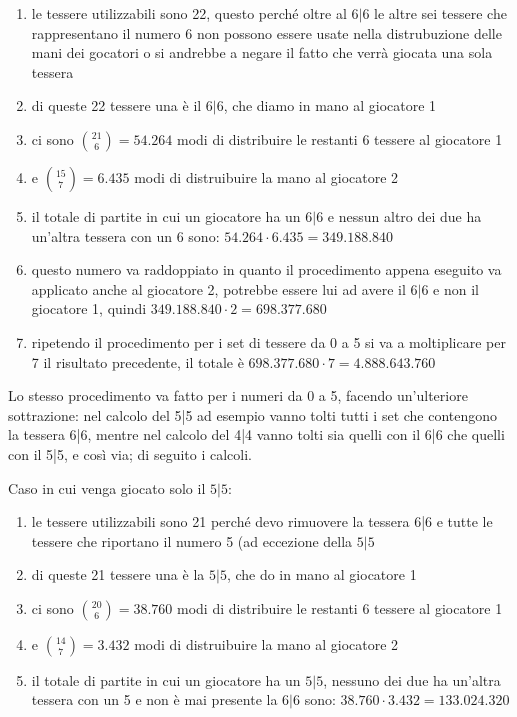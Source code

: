 \documentclass[a4paper,12pt]{report}
\begin{document}
\begin{enumerate}
    \item le tessere utilizzabili sono 22, questo perché oltre al \(6|6\) le altre sei tessere che rappresentano il numero 6 non possono essere usate nella distrubuzione delle mani dei gocatori o si andrebbe a negare il fatto che verrà giocata una sola tessera 
    \item di queste 22 tessere una è il \(6|6\), che diamo in mano al giocatore 1
    \item ci sono \(\binom{21}{6} = 54.264\) modi di distribuire le restanti 6 tessere al giocatore 1
    \item e \(\binom{15}{7} = 6.435\) modi di distruibuire la mano al giocatore 2
    \item il totale di partite in cui un giocatore ha un \(6|6\) e nessun altro dei due ha un'altra tessera con un 6 sono: \(54.264 \cdot 6.435 = 349.188.840\)
    \item questo numero va raddoppiato in quanto il procedimento appena eseguito va applicato anche al giocatore 2, potrebbe essere lui ad avere il \(6|6\) e non il giocatore 1, quindi \(349.188.840 \cdot 2 = 698.377.680\)
    \item ripetendo il procedimento per i set di tessere da 0 a 5 si va a moltiplicare per 7 il risultato precedente, il totale è \(698.377.680 \cdot 7 = 4.888.643.760\)
\end{enumerate}

Lo stesso procedimento va fatto per i numeri da 0 a 5, facendo un'ulteriore sottrazione: nel calcolo del 5|5 ad esempio vanno tolti tutti i set che contengono la tessera 6|6, mentre nel calcolo del 4|4 vanno tolti sia quelli con il 6|6 che quelli con il 5|5, e così via; di seguito i calcoli.

Caso in cui venga giocato solo il \(5|5\):
\begin{enumerate}
    \item le tessere utilizzabili sono 21 perché devo rimuovere la tessera 6|6 e tutte le tessere che riportano il numero 5 (ad eccezione della \(5|5\) 
    \item di queste 21 tessere una è la \(5|5\), che do in mano al giocatore 1
    \item ci sono \(\binom{20}{6} = 38.760\) modi di distribuire le restanti 6 tessere al giocatore 1
    \item e \(\binom{14}{7} = 3.432\) modi di distruibuire la mano al giocatore 2
    \item il totale di partite in cui un giocatore ha un \(5|5\), nessuno dei due ha un'altra tessera con un 5 e non è mai presente la \(6|6\) sono: \(38.760 \cdot 3.432 = 133.024.320\)
\end{enumerate}
\end{document}
